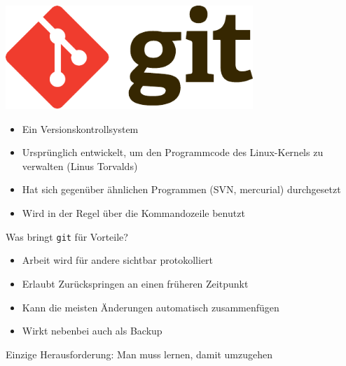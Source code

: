 \begin{frame}
    \centering
    \includegraphics[width=0.7\textwidth]{logos/git.pdf}

    \vspace{1em}

    \begin{itemize}
      \item Ein Versionskontrollsystem
      \item Ursprünglich entwickelt, um den Programmcode des Linux-Kernels zu verwalten (Linus Torvalds)
      \item Hat sich gegenüber ähnlichen Programmen (SVN, mercurial) durchgesetzt
      \item Wird in der Regel über die Kommandozeile benutzt
    \end{itemize}
\end{frame}

\begin{frame}{Was bringt \texttt{git} für Vorteile?}
  \begin{itemize}
    \item Arbeit wird für andere sichtbar protokolliert
    \item Erlaubt Zurückspringen an einen früheren Zeitpunkt
    \item Kann die meisten Änderungen automatisch zusammenfügen
    \item Wirkt nebenbei auch als Backup
  \end{itemize}
  Einzige Herausforderung: Man muss lernen, damit umzugehen
\end{frame}

